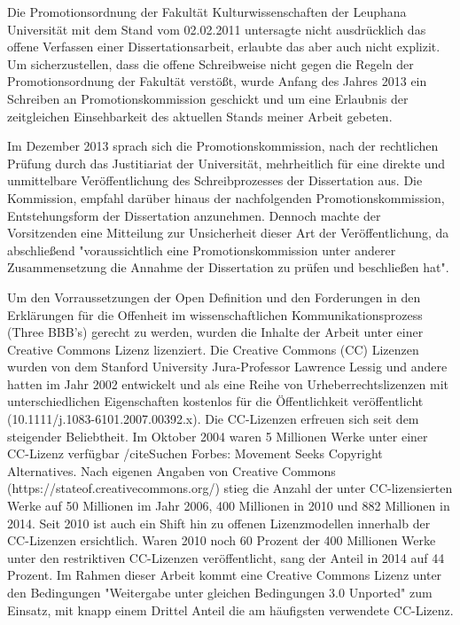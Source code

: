 Die Promotionsordnung der Fakultät Kulturwissenschaften der Leuphana Universität mit dem Stand vom 02.02.2011 untersagte nicht ausdrücklich das offene Verfassen einer Dissertationsarbeit, erlaubte das aber auch nicht explizit. Um sicherzustellen, dass die offene Schreibweise nicht gegen die Regeln der Promotionsordnung der Fakultät verstößt, wurde Anfang des Jahres 2013 ein Schreiben an Promotionskommission geschickt und um eine Erlaubnis der zeitgleichen Einsehbarkeit des aktuellen Stands meiner Arbeit gebeten.

Im Dezember 2013 sprach sich die Promotionskommission, nach der rechtlichen Prüfung durch das Justitiariat der Universität, mehrheitlich für eine direkte und unmittelbare Veröffentlichung des Schreibprozesses der Dissertation aus. Die Kommission, empfahl darüber hinaus der nachfolgenden Promotionskommission, Entstehungsform der Dissertation anzunehmen. Dennoch machte der Vorsitzenden eine Mitteilung zur Unsicherheit dieser Art der Veröffentlichung, da abschließend "voraussichtlich eine Promotionskommission unter anderer Zusammensetzung die Annahme der Dissertation zu prüfen und beschließen hat".

Um den Vorraussetzungen der Open Definition und den Forderungen in den Erklärungen für die Offenheit im wissenschaftlichen Kommunikationsprozess (Three BBB's) gerecht zu werden, wurden die Inhalte der Arbeit unter einer Creative Commons Lizenz lizenziert. Die Creative Commons (CC) Lizenzen wurden von dem Stanford University Jura-Professor Lawrence Lessig und andere hatten im Jahr 2002 entwickelt und als eine Reihe von Urheberrechtslizenzen mit unterschiedlichen Eigenschaften kostenlos für die Öffentlichkeit veröffentlicht (10.1111/j.1083-6101.2007.00392.x). Die CC-Lizenzen erfreuen sich seit dem steigender Beliebtheit. Im Oktober 2004 waren 5 Millionen Werke unter einer CC-Lizenz verfügbar /cite{Suchen Forbes: Movement Seeks Copyright Alternatives}. Nach eigenen Angaben von Creative Commons (https://stateof.creativecommons.org/) stieg die Anzahl der unter CC-lizensierten Werke auf 50 Millionen im Jahr 2006, 400 Millionen in 2010 und 882 Millionen in 2014. Seit 2010 ist auch ein Shift hin zu offenen Lizenzmodellen innerhalb der CC-Lizenzen ersichtlich. Waren 2010 noch 60 Prozent der 400 Millionen Werke unter den restriktiven CC-Lizenzen veröffentlicht, sang der Anteil in 2014 auf 44 Prozent. Im Rahmen dieser Arbeit kommt eine Creative Commons Lizenz unter den Bedingungen "Weitergabe unter gleichen Bedingungen 3.0 Unported" zum Einsatz, mit knapp einem Drittel Anteil die am häufigsten verwendete CC-Lizenz.

